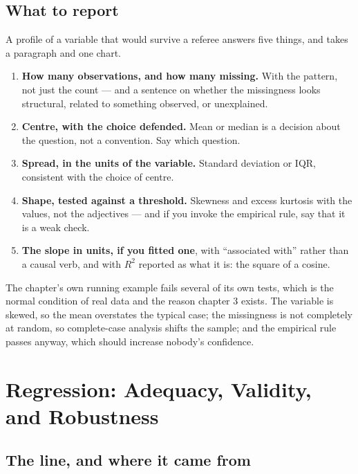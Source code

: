 \documentclass[
  letterpaper,
  10pt,
  twoside,
  openright,
  numbers=noenddot,
  chapterprefix=true]{scrbook}
\providecommand{\tightlist}{%
  \setlength{\itemsep}{0pt}\setlength{\parskip}{0pt}}
\begin{document}
\section{What to report}\label{what-to-report}

A profile of a variable that would survive a referee answers five
things, and takes a paragraph and one chart.

\begin{enumerate}
\def\labelenumi{\arabic{enumi}.}
\tightlist
\item
  \textbf{How many observations, and how many missing.} With the
  pattern, not just the count --- and a sentence on whether the
  missingness looks structural, related to something observed, or
  unexplained.
\item
  \textbf{Centre, with the choice defended.} Mean or median is a
  decision about the question, not a convention. Say which question.
\item
  \textbf{Spread, in the units of the variable.} Standard deviation or
  IQR, consistent with the choice of centre.
\item
  \textbf{Shape, tested against a threshold.} Skewness and excess
  kurtosis with the values, not the adjectives --- and if you invoke the
  empirical rule, say that it is a weak check.
\item
  \textbf{The slope in units, if you fitted one}, with ``associated
  with'' rather than a causal verb, and with \(R^2\) reported as what it
  is: the square of a cosine.
\end{enumerate}

The chapter's own running example fails several of its own tests, which
is the normal condition of real data and the reason chapter 3 exists.
The variable is skewed, so the mean overstates the typical case; the
missingness is not completely at random, so complete-case analysis
shifts the sample; and the empirical rule passes anyway, which should
increase nobody's confidence.


\chapter{Regression: Adequacy, Validity, and
Robustness}\label{regression-adequacy-validity-and-robustness}

\section{The line, and where it came
from}\label{the-line-and-where-it-came-from}
\end{document}
